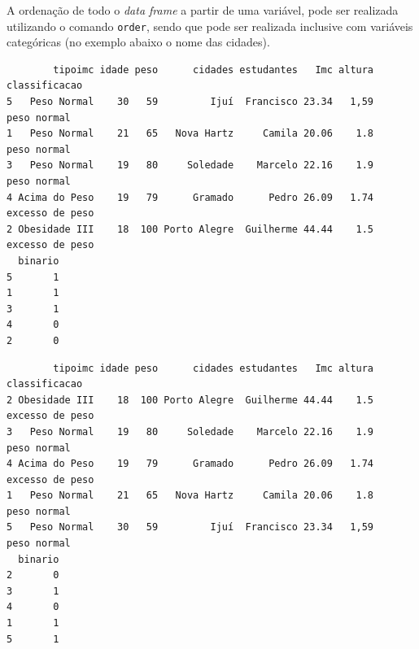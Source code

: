 \documentclass[12pt,brazil,oneside]{book}
\newenvironment{Shaded}{\begin{snugshade}}{\end{snugshade}}
\newcommand{\CommentTok}[1]{\textcolor[rgb]{0.56,0.35,0.01}{\textit{#1}}}
\newcommand{\DataTypeTok}[1]{\textcolor[rgb]{0.13,0.29,0.53}{#1}}
\newcommand{\KeywordTok}[1]{\textcolor[rgb]{0.13,0.29,0.53}{\textbf{#1}}}
\newcommand{\NormalTok}[1]{#1}
\newcommand{\OperatorTok}[1]{\textcolor[rgb]{0.81,0.36,0.00}{\textbf{#1}}}
\newcommand{\OtherTok}[1]{\textcolor[rgb]{0.56,0.35,0.01}{#1}}
\begin{document}
A ordenação de todo o \emph{data frame} a partir de uma variável, pode
ser realizada utilizando o comando \texttt{order}, sendo que pode ser
realizada inclusive com variáveis categóricas (no exemplo abaixo o nome
das cidades).

\begin{Shaded}
\end{Shaded}

\begin{verbatim}
        tipoimc idade peso      cidades estudantes   Imc altura   classificacao
5   Peso Normal    30   59         Ijuí  Francisco 23.34   1,59     peso normal
1   Peso Normal    21   65   Nova Hartz     Camila 20.06    1.8     peso normal
3   Peso Normal    19   80     Soledade    Marcelo 22.16    1.9     peso normal
4 Acima do Peso    19   79      Gramado      Pedro 26.09   1.74 excesso de peso
2 Obesidade III    18  100 Porto Alegre  Guilherme 44.44    1.5 excesso de peso
  binario
5       1
1       1
3       1
4       0
2       0
\end{verbatim}

\begin{Shaded}
\end{Shaded}

\begin{verbatim}
        tipoimc idade peso      cidades estudantes   Imc altura   classificacao
2 Obesidade III    18  100 Porto Alegre  Guilherme 44.44    1.5 excesso de peso
3   Peso Normal    19   80     Soledade    Marcelo 22.16    1.9     peso normal
4 Acima do Peso    19   79      Gramado      Pedro 26.09   1.74 excesso de peso
1   Peso Normal    21   65   Nova Hartz     Camila 20.06    1.8     peso normal
5   Peso Normal    30   59         Ijuí  Francisco 23.34   1,59     peso normal
  binario
2       0
3       1
4       0
1       1
5       1
\end{verbatim}

\begin{Shaded}
\end{Shaded}
\end{document}
